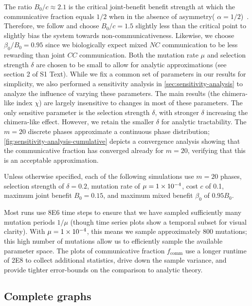 \documentclass[10pt,letterpaper]{article}
\begin{document}
The ratio $B_0/c \approx 2.1$ is the critical joint-benefit benefit strength
at which the communicative fraction equals $1/2$ when
in the absence of asymmetry(\ie{} $\alpha =
1/2$)~\cite{tripp2022evolutionary}.
Therefore, we follow \cite{tripp2022evolutionary} and choose $B_0/c = 1.5$
slightly less than the critical point to slightly bias the system towards
non-communicativeness.
Likewise, we choose $\beta_0/B_0 = 0.95$ since we biologically expect
mixed $NC$ communication to be less rewarding than joint $CC$
communication.
Both the mutation rate $\mu$ and selection strength $\delta$
are chosen to be small to allow for analytic approximations
(see section 2 of S1 Text).
While we fix a common set of parameters in our results for simplicity,
we also performed a sensitivity analysis in
\cref{sec:sensitivity-analysis} to analyze the influence of varying
these parameters.
The main results (the chimera-like index $\chi$)
are largely insensitive to changes in
most of these parameters.
The only sensitive parameter is the selection strength $\delta$,
with stronger $\delta$ increasing the chimera-like effect.
However, we retain the smaller $\delta$ for analytic tractability.
The $m = 20$ discrete phases approximate a continuous phase
distribution;
\cref{fig:sensitivity-analysis-cumulative}
depicts a convergence analysis
showing that the communicative fraction
has converged already for $m=20$, verifying that this is an acceptable
approximation.

Unless otherwise specified,
each of the following simulations use
$m = 20$ phases,
selection strength of $\delta=0.2$,
mutation rate of $\mu=\num{1E-4}$,
cost $c$ of \num{0.1},
maximum joint benefit $B_0 = 0.15$,
and maximum mixed benefit $\beta_0$ of $\num{0.95} B_0$.

Most runs use \num{8E6} time steps
to ensure that we have sampled sufficiently many
mutation periods  $1/\mu$
(though time series plots show a temporal subset for visual clarity).
With $\mu=\num{1E-4}$, this means we sample approximately \num{800}
mutations;
this high number of mutations allow us
to efficiently sample the available parameter space.
The plots of communicative fraction $f_{\text{comm}}$
use a longer runtime of \num{2E8}
to collect additional statistics, drive down the sample variance,
and provide tighter error-bounds on the comparison to analytic theory.

\subsection{Complete graphs}\label{sec:complete_graph}
\end{document}
